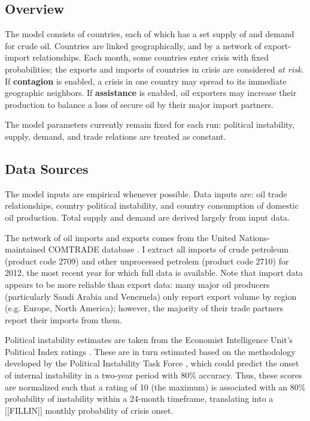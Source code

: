 \documentclass{article}
\begin{document}
\subsection{Overview}

The model consists of countries, each of which has a set supply of and demand for crude oil. Countries are linked geographically, and by a network of export-import relationships. Each month, some countries enter crisis with fixed probabilities; the exports and imports of countries in crisis are considered \emph{at risk}. If \textbf{contagion} is enabled, a crisis in one country may spread to its immediate geographic neighbors. If \textbf{assistance} is enabled, oil exporters may increase their production to balance a loss of secure oil by their major import partners.

The model parameters currently remain fixed for each run: political instability, supply, demand, and trade relations are treated as constant. 

\subsection{Data Sources}
The model inputs are empirical whenever possible. Data inputs are: oil trade relationships, country political instability, and country consumption of domestic oil production. Total supply and demand are derived largely from input data.

The network of oil imports and exports comes from the United Nations-maintained COMTRADE database \citep{un_2013}. I extract all imports of crude petroleum (product code 2709) and other unprocessed petrolem (product code 2710) for 2012, the most recent year for which full data is available. Note that import data appears to be more reliable than export data: many major oil producers (particularly Saudi Arabia and Venezuela) only report export volume by region (e.g. Europe, North America); however, the majority of their trade partners report their imports from them.

Political instability estimates are taken from the Economist Intelligence Unit's Political Index ratings \citep{eiu_2013}. These are in turn estimated based on the methodology developed by the Political Instability Task Force \citep{goldstone_2005}, which could predict the onset of internal instability in a two-year period with 80\% accuracy. Thus, these scores are normalized such that a rating of 10 (the maximum) is associated with an 80\% probability of instability within a 24-month timeframe, translating into a [[FILLIN]] monthly probability of crisis onset.
\end{document}

